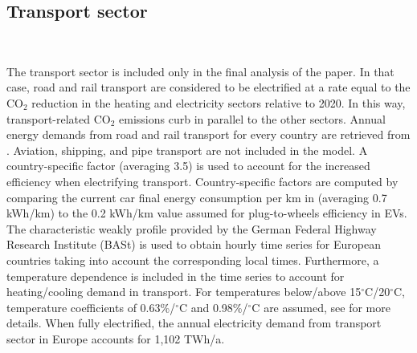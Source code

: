 \documentclass[3p]{elsarticle} %
\begin{document}

\FloatBarrier

\subsection{Transport sector} \

The transport sector is included only in the final analysis of the paper. In that case, road and rail transport are considered to be electrified at a rate equal to the CO$_2$ reduction in the heating and electricity sectors relative to 2020. In this way, transport-related CO$_2$ emissions curb in parallel to the other sectors. Annual energy demands from road and rail transport for every country are retrieved from \cite{ODYSSEE}. Aviation, shipping, and pipe transport are not included in the model.  A country-specific factor (averaging 3.5) is used to account for the increased efficiency when electrifying transport. Country-specific factors are computed by comparing the current car final energy consumption per km in \cite{ODYSSEE} (averaging 0.7 kWh/km) to the 0.2 kWh/km value assumed for plug-to-wheels efficiency in EVs. The characteristic weakly profile provided by the German Federal Highway Research Institute (BASt) \cite{BASt} is used to obtain hourly time series for European countries taking into account the corresponding local times. Furthermore, a temperature dependence is included in the time series to account for heating/cooling demand in transport. For temperatures below/above 15$^{\circ}$C/20$^{\circ}$C, temperature coefficients of 0.63\%/$^{\circ}$C and 0.98\%/$^{\circ}$C are assumed, see \cite{Brown_2018} for more details. When fully electrified, the annual electricity demand from transport sector in Europe accounts for 1,102 TWh/a. 
\end{document}
